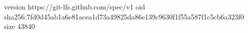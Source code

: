 version https://git-lfs.github.com/spec/v1
oid sha256:7fd0d45ab1a6e81acea1d73a49825da86e139c9630f1f55a587f1c5cb6a323f0
size 43840

